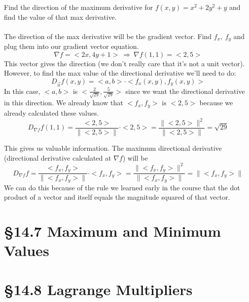 \documentclass[12 pt]{article}
\begin{document}
        \begin{exmp*}
            Find the direction of the maximum derivative for $f(x,y)=x^2+2y^2+y$ and find the value of that max derivative.\\\\
            The direction of the max derivative will be the gradient vector. Find $f_x,\ f_y$ and plug them into our gradient vector equation.
            $$\nabla f=<2x,4y+1>\ \Rightarrow\ \nabla f(1,1)=<2,5>$$
            This vector gives the direction (we don't really care that it's not a unit vector). However, to find the max value of the directional derivative we'll need to do:
            $$D_{\vec{u}}f(x,y)=<a,b>\cdot<f_x(x,y),f_y(x,y)>$$
            In this case, $<a,b>$ is $<\frac{2}{\sqrt{29}},\frac{5}{\sqrt{29}}>$ since we want the directional derivative in this direction. We already know that $<f_x,f_y>$ is $<2,5>$ because we already calculated these values.
            $$D_{\nabla f}f(1,1)=\frac{<2,5>}{\parallel <2,5>\parallel}\cdot<2,5>=\frac{\parallel<2,5>\parallel^2}{\parallel<2,5>\parallel}=\sqrt{29}$$
        \end{exmp*}
        This gives us valuable information. The maximum directional derivative (directional derivative calculated at $\nabla f$) will be
        $$D_{\nabla f}f=\frac{<f_x,f_y>}{\parallel <f_x,f_y>\parallel}\cdot<f_x,f_y>=\frac{\parallel<f_x,f_y>\parallel^2}{\parallel<f_x,f_y>\parallel}=\parallel<f_x,f_y>\parallel$$
        We can do this because of the rule we learned early in the course that the dot product of a vector and itself equals the magnitude squared of that vector.
    \section{\S 14.7 Maximum and Minimum Values}
    \section{\S 14.8 Lagrange Multipliers}
\end{document}
